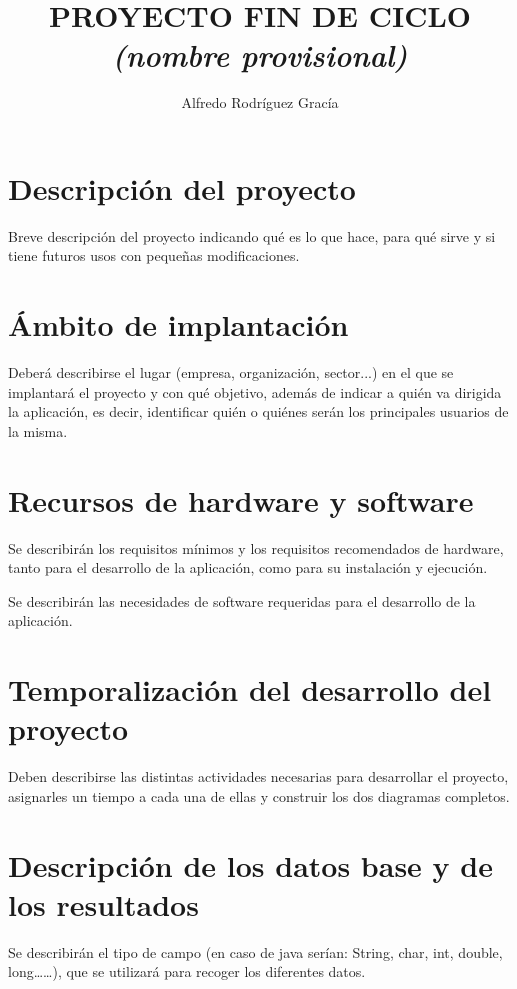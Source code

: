 \documentclass[12pt,a4paper,titlepage]{article}
\title{PROYECTO FIN DE CICLO\\\emph{\small{(nombre provisional)}}}
\author{Alfredo Rodríguez Gracía}
\begin{document}
    \maketitle

    \section{Descripción del proyecto}

    Breve descripción del proyecto indicando qué es lo que hace, para qué sirve y si tiene futuros usos con pequeñas modificaciones.

    \section{Ámbito de implantación}

    Deberá describirse el lugar (empresa, organización, sector...) en el que se implantará el proyecto y con qué objetivo, además de indicar a quién va dirigida la aplicación, es decir, identificar quién o quiénes serán los principales usuarios de la misma.

    \section{Recursos de hardware y software}

    Se describirán los requisitos mínimos y los requisitos recomendados de hardware, tanto para el desarrollo de la aplicación, como para su instalación y ejecución.

    Se describirán las necesidades de software requeridas para el desarrollo de la aplicación.

    \section{Temporalización del desarrollo del proyecto}

    Deben describirse las distintas actividades necesarias para desarrollar el proyecto, asignarles un tiempo a cada una de ellas y construir los dos diagramas completos.

    \section{Descripción de los datos base y de los resultados}

    Se describirán el tipo de campo (en caso de java serían: String, char, int, double, long……), que se utilizará para recoger los diferentes datos.
\end{document}
